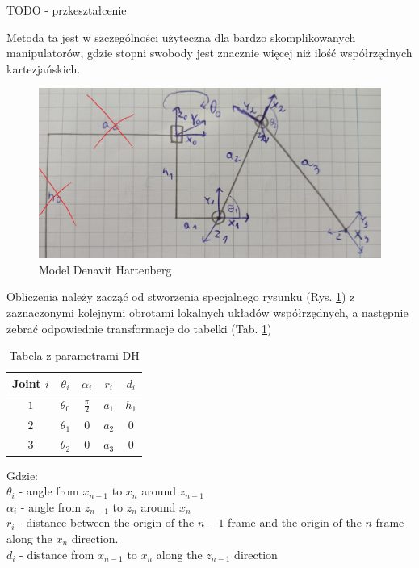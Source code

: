\documentclass[a4paper,13pt]{article}
\begin{document}
TODO - przkeształcenie

Metoda ta jest w szczególności użyteczna dla bardzo skomplikowanych manipulatorów, gdzie stopni swobody jest znacznie więcej niż ilość współrzędnych kartezjańskich.

\begin{figure}[H]
\includegraphics[width=\textwidth]{img/DH_model.jpg}
\caption{Model Denavit Hartenberg}
\label{math_model_DH}
\end{figure}

Obliczenia należy zacząć od stworzenia specjalnego rysunku (Rys. \ref{math_model_DH}) z zaznaczonymi kolejnymi obrotami lokalnych układów współrzędnych, a następnie zebrać odpowiednie transformacje do tabelki (Tab. \ref{table:DH_table})

\begin{table}[h!]
\centering
\begin{tabular}{c | c c c c }
 Joint $i$ & $\theta_i$ & $\alpha_i$ & $r_i$ & $d_i$ \\
 \hline
 $1$  & $\theta_0$ & $\frac{\pi}{2}$ & $a_1$ & $h_1$ \\
 $2$  & $\theta_1$ & $0$ & $a_2$ & $0$ \\
 $3$  & $\theta_2$ & $0$ & $a_3$ & $0$ \\
\end{tabular}
\caption{Tabela z parametrami DH}
\label{table:DH_table}
\end{table}

Gdzie: \\
$\theta_i$ - angle from $x_{n-1}$ to $x_n$ around $z_{n-1}$\\
$\alpha_i$ - angle from $z_{n-1}$ to $z_n$ around $x_n$\\
$r_i$ - distance between the origin of the $n-1$ frame and the origin of the $n$ frame along the $x_n$ direction.\\ 
$d_i$ - distance from $x_{n-1}$ to $x_n$ along the $z_{n-1}$ direction\\
\end{document}
